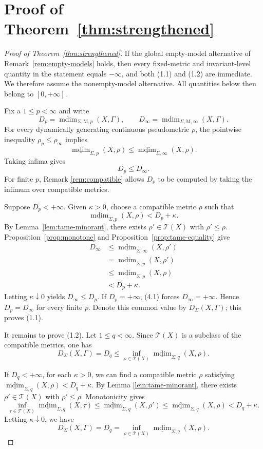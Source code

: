 \documentclass[12pt]{amsart}
\theoremstyle{definition}
\theoremstyle{remark}
\newcommand{\mdim}{\operatorname{mdim}}
\begin{document}
\section{Proof of Theorem~\ref{thm:strengthened}}\label{sec:main}
\begin{proof}[Proof of Theorem~\ref{thm:strengthened}]
If the global empty-model alternative of Remark~\ref{rem:empty-models} holds, then every fixed-metric and invariant-level quantity in the statement equals $-\infty$, and both (1.1) and (1.2) are immediate. We therefore assume the nonempty-model alternative. All quantities below then belong to $[0,+\infty]$.

Fix a $1\leq p < \infty$ and write
\[
 D_p=\mdim_{\Sigma,\mathrm M,p}(X,\Gamma),
 \qquad
 D_\infty=\mdim_{\Sigma,\mathrm M,\infty}(X,\Gamma).
\]
For every dynamically generating continuous pseudometric $\rho$, the pointwise inequality $\rho_p\leq\rho_\infty$ implies
\[
 \underline{\mdim}_{\Sigma,p}(X,\rho)
 \leq
 \underline{\mdim}_{\Sigma,\infty}(X,\rho).
\]
Taking infima gives
\[
 D_p\leq D_\infty.
 \tag{4.1}
\]
For finite $p$, Remark \ref{rem:compatible} allows $D_p$ to be computed by taking the infimum over compatible metrics.

Suppose  $D_p<+\infty$. Given $\kappa>0$, choose a compatible metric $\rho$ such that
\[
 \underline{\mdim}_{\Sigma,p}(X,\rho)<D_p+\kappa.
 \tag{4.2}
\]
By Lemma~\ref{lem:tame-minorant}, there exists $\rho'\in\mathcal T(X)$ with $\rho'\leq\rho$. Proposition~\ref{prop:monotone} and Proposition~\ref{prop:tame-equality} give
\begin{align*}
 D_\infty
 &\leq \underline{\mdim}_{\Sigma,\infty}(X,\rho')\\
 &=\underline{\mdim}_{\Sigma,p}(X,\rho')\\
 &\leq\underline{\mdim}_{\Sigma,p}(X,\rho)\\
 &<D_p+\kappa.
\end{align*}
Letting $\kappa\downarrow0$ yields $D_\infty\leq D_p$. If $D_p=+\infty$, (4.1) forces $D_\infty=+\infty$. Hence $D_p=D_\infty$ for every finite $p$. Denote this common value by $D_\Sigma(X,\Gamma)$; this proves (1.1).

It remains to prove (1.2). Let $1\leq q<\infty$. Since $\mathcal T(X)$ is a subclass of the compatible metrics, one has
\[
 D_\Sigma(X,\Gamma)=D_q
 \leq
 \inf_{\rho\in\mathcal T(X)}
 \underline{\mdim}_{\Sigma,q}(X,\rho).
 \tag{4.3}
\]

If $D_q<+\infty$, for each $\kappa>0$, we can find a compatible metric $\rho$ satisfying $\underline{\mdim}_{\Sigma,q}(X,\rho)<D_q+\kappa$. By Lemma \ref{lem:tame-minorant}, there exists $\rho'\in\mathcal T(X)$ with $\rho'\leq\rho$. Monotonicity gives
\[
 \inf_{\tau\in\mathcal T(X)}
 \underline{\mdim}_{\Sigma,q}(X,\tau)
 \leq
 \underline{\mdim}_{\Sigma,q}(X,\rho')
 \leq
 \underline{\mdim}_{\Sigma,q}(X,\rho)
 <D_q+\kappa.
\]
Letting $\kappa\downarrow0$, we have
 \[
 D_\Sigma(X,\Gamma)=D_q
 =
 \inf_{\rho\in\mathcal T(X)}
 \underline{\mdim}_{\Sigma,q}(X,\rho).
\]


\end{proof}
\end{document}
